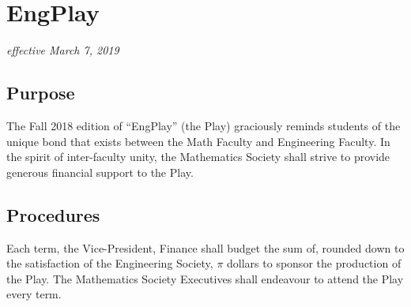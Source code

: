 \section{EngPlay}
\emph{effective March 7, 2019}\\

\subsection{Purpose}

The Fall 2018 edition of ``EngPlay'' (the Play) graciously reminds students of the unique bond that exists between the Math Faculty and Engineering Faculty. In the spirit of inter-faculty unity, the Mathematics Society shall strive to provide generous financial support to the Play.

\subsection{Procedures}

Each term, the Vice-President, Finance shall budget the sum of, rounded down to the satisfaction of the Engineering Society, $\pi$ dollars to sponsor the production of the Play. The Mathematics Society Executives shall endeavour to attend the Play every term.
